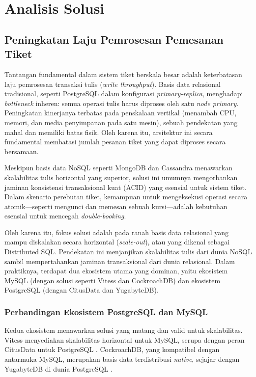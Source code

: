 \section{Analisis Solusi}

\subsection{Peningkatan Laju Pemrosesan Pemesanan Tiket}
Tantangan fundamental dalam sistem tiket berskala besar adalah keterbatasan laju pemrosesan transaksi tulis (\textit{write throughput}). Basis data relasional tradisional, seperti PostgreSQL dalam konfigurasi \textit{primary-replica}, menghadapi \textit{bottleneck} inheren: semua operasi tulis harus diproses oleh satu \textit{node primary}. Peningkatan kinerjanya terbatas pada penskalaan vertikal (menambah CPU, memori, dan media penyimpanan pada satu mesin), sebuah pendekatan yang mahal dan memiliki batas fisik. Oleh karena itu, arsitektur ini secara fundamental membatasi jumlah pesanan tiket yang dapat diproses secara bersamaan.

Meskipun basis data NoSQL seperti MongoDB dan Cassandra menawarkan skalabilitas tulis horizontal yang superior, solusi ini umumnya mengorbankan jaminan konsistensi transaksional kuat (ACID) yang esensial untuk sistem tiket. Dalam skenario perebutan tiket, kemampuan untuk mengeksekusi operasi secara atomik—seperti mengunci dan memesan sebuah kursi—adalah kebutuhan esensial untuk mencegah \textit{double-booking}.

Oleh karena itu, fokus solusi adalah pada ranah basis data relasional yang mampu diskalakan secara horizontal (\textit{scale-out}), atau yang dikenal sebagai Distributed SQL. Pendekatan ini menjanjikan skalabilitas tulis dari dunia NoSQL sambil mempertahankan jaminan transaksional dari dunia relasional. Dalam praktiknya, terdapat dua ekosistem utama yang dominan, yaitu ekosistem MySQL (dengan solusi seperti Vitess dan CockroachDB) dan ekosistem PostgreSQL (dengan CitusData dan YugabyteDB).

\subsubsection{Perbandingan Ekosistem PostgreSQL dan MySQL}

Kedua ekosistem menawarkan solusi yang matang dan valid untuk skalabilitas. Vitess menyediakan skalabilitas horizontal untuk MySQL, serupa dengan peran CitusData untuk PostgreSQL \parencite{vitess}. CockroachDB, yang kompatibel dengan antarmuka MySQL, merupakan basis data terdistribusi \textit{native}, sejajar dengan YugabyteDB di dunia PostgreSQL \parencite{cockroachDB}.

